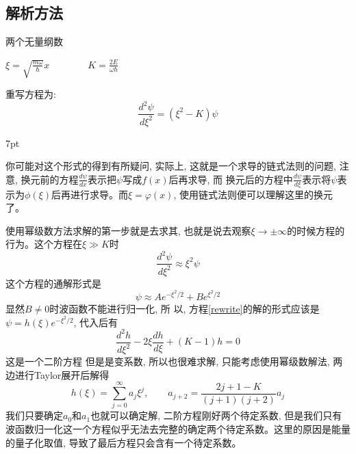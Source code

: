 \documentclass[a4paper,zihao=-4,linespread=1]{ctexrep}
\newenvironment{lequation}{\large\begin{equation}}{\end{equation}}
\newenvironment{thinknote}{%
\def\FrameCommand{%
\hspace{1pt}%
{\color{BurlyWood}\vrule width 2pt}%
{\color{formalshade}\vrule width 4pt}%
\colorbox{formalshade}%
}%
\MakeFramed{\advance\hsize-\width\FrameRestore}%
\noindent\hspace{-4.55pt}%
\begin{adjustwidth}{}{7pt}%
\vspace{2pt}\vspace{2pt}%
}
{%
\vspace{2pt}\end{adjustwidth}\endMakeFramed%
}
\begin{document}
    \subsection{解析方法}
    \begin{define}{两个无量纲数}
        \begin{center}
            \begin{math}
            \displaystyle
            \xi = \sqrt{\frac{m\omega}{\hbar}}x \qquad\qquad K=\frac{2E}{\omega\hbar}
            \end{math}
        \end{center}
    \end{define}
    重写方程为:
    \begin{lequation}
        \label{rewrite}
        \frac{d^2\psi}{d\xi^2}=(\xi^2-K)\psi
    \end{lequation}
    \begin{thinknote}
        你可能对这个形式的得到有所疑问, 实际上, 这就是一个求导的链式法则的问题, 注意, 换元前的方程$\frac{d\psi}{dx}$表示把$\psi$写成$f(x)$后再求导, 而
        换元后的方程中$\frac{d\psi}{d\xi}$表示将$\psi$表示为$\phi(\xi)$后再进行求导。而$\xi=\varphi(x)$, 使用链式法则便可以理解这里的换元了。
    \end{thinknote}
    使用幂级数方法求解的第一步就是去求其, 也就是说去观察$\xi \to \pm\infty$的时候方程的行为。这个方程在$\xi\gg K$时
    $$\frac{d^2\psi}{d\xi^2}\approx\xi^2\psi$$这个方程的通解形式是$$\psi\approx Ae^{-\xi^2/2}+Be^{\xi^2/2}$$显然$B\neq 0$时波函数不能进行归一化, 所
    以, 方程\ref{rewrite}的解的形式应该是$\psi = h(\xi)e^{-\xi^2/2}$, 代入后有$$\frac{d^2h}{d\xi^2}-2\xi\frac{dh}{d\xi}+(K-1)h=0$$这是一个二阶方程
    但是是变系数, 所以也很难求解, 只能考虑使用幂级数解法, 两边进行Taylor展开后解得$$h(\xi)=\sum_{j=0}^\infty a_j\xi^j,\qquad a_{j+2}=\frac{2j+1-K}{(j+1)(j+2)}a_j$$
    我们只要确定$a_0$和$a_1$也就可以确定解, 二阶方程刚好两个待定系数, 但是我们只有波函数归一化这一个方程似乎无法去完整的确定两个待定系数。这里的原因是能量
    的量子化取值, 导致了最后方程只会含有一个待定系数。
\end{document}
